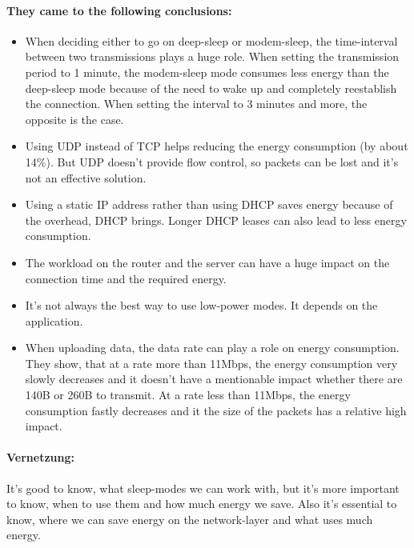 \documentclass{report}
\begin{document}
\paragraph{They came to the following conclusions:}
\begin{itemize}
    \item When deciding either to go on deep-sleep or modem-sleep, the time-interval between two transmissions plays a huge role. When setting the transmission period to 1 minute, the modem-sleep mode consumes less energy than the deep-sleep mode because of the need to wake up and completely reestablish the connection. When setting the interval to 3 minutes and more, the opposite is the case.
    \item Using UDP instead of TCP helps reducing the energy consumption (by about 14\%). But UDP doesn't provide flow control, so packets can be lost and it's not an effective solution.
    \item Using a static IP address rather than using DHCP saves energy because of the overhead, DHCP brings. Longer DHCP leases can also lead to less energy consumption.
    \item The workload on the router and the server can have a huge impact on the connection time and the required energy.  
    \item It's not always the best way to use low-power modes. It depends on the application. 
    \item When uploading data, the data rate can play a role on energy consumption. They show, that at a rate more than 11Mbps, the energy consumption very slowly decreases and it doesn't have a mentionable impact whether there are 140B or 260B to transmit. At a rate less than 11Mbps, the energy consumption fastly decreases and it the size of the packets has a relative high impact.
\end{itemize} 
\paragraph{Vernetzung:}
It's good to know, what sleep-modes we can work with, but it's more important to know, when to use them and how much energy we save. Also it's essential to know, where we can save energy on the network-layer and what uses much energy.


\pagebreak
\end{document}
